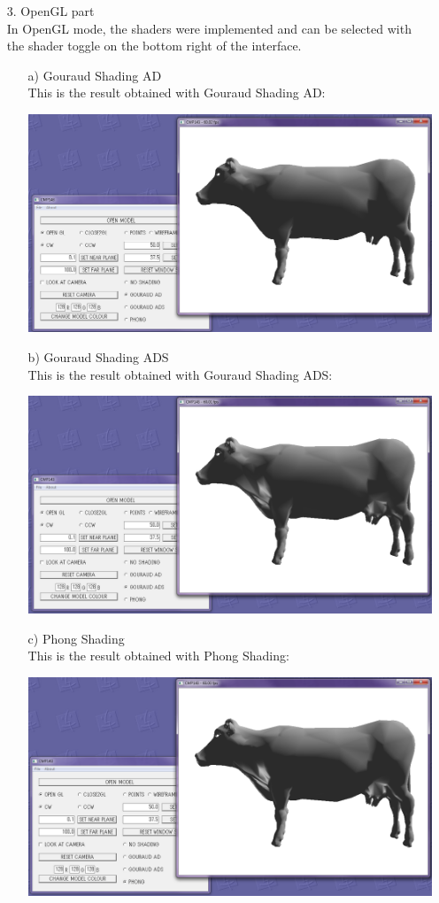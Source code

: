 \documentclass[12pt]{article}
\begin{document}
\begin{itemize}
\item[3.] OpenGL part\\
In OpenGL mode, the shaders were implemented and can be selected with the shader toggle on the bottom right of the interface.
\begin{itemize}
\item[a)]Gouraud Shading AD\\
This is the result obtained with Gouraud Shading AD:
\begin{center}
\includegraphics[scale=0.4]{15.png}
\end{center}
\item[b)] Gouraud Shading ADS\\
This is the result obtained with Gouraud Shading ADS:
\begin{center}
\includegraphics[scale=0.4]{16.png}
\end{center}
\item[c)] Phong Shading\\
This is the result obtained with Phong Shading:
\begin{center}
\includegraphics[scale=0.4]{17.png}

\end{center}
\end{itemize}
\end{itemize}
\end{document}
